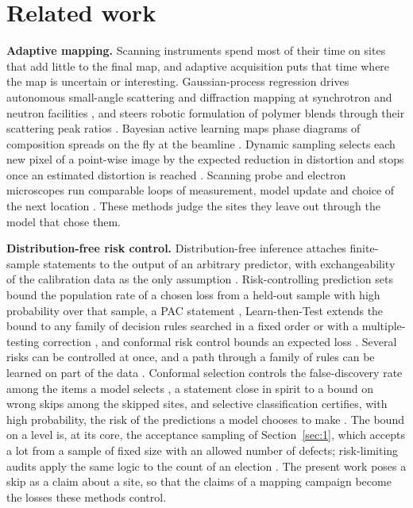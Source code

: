 \documentclass{iopjournal}
\begin{document}
\hypertarget{sec:2}{%
\section{Related work}\label{sec:2}}

\textbf{Adaptive mapping.} Scanning instruments spend most of their time on sites that add little to the final map, and adaptive acquisition puts that time where the map is uncertain or interesting. Gaussian-process regression drives autonomous small-angle scattering and diffraction mapping at synchrotron and neutron facilities \cite{Noack2019,Noack2020,Noack2021}, and steers robotic formulation of polymer blends through their scattering peak ratios \cite{Upreti2026}. Bayesian active learning maps phase diagrams of composition spreads on the fly at the beamline \cite{Kusne2020}. Dynamic sampling selects each new pixel of a point-wise image by the expected reduction in distortion and stops once an estimated distortion is reached \cite{Godaliyadda2018}. Scanning probe and electron microscopes run comparable loops of measurement, model update and choice of the next location \cite{Kalinin2021,Ziatdinov2022}. These methods judge the sites they leave out through the model that chose them.

\textbf{Distribution-free risk control.} Distribution-free inference attaches finite-sample statements to the output of an arbitrary predictor, with exchangeability of the calibration data as the only assumption \cite{Vovk2005,Angelopoulos2023}. Risk-controlling prediction sets bound the population rate of a chosen loss from a held-out sample with high probability over that sample, a PAC statement \cite{Bates2021,Park2020}, Learn-then-Test extends the bound to any family of decision rules searched in a fixed order or with a multiple-testing correction \cite{Angelopoulos2025}, and conformal risk control bounds an expected loss \cite{Angelopoulos2024}. Several risks can be controlled at once, and a path through a family of rules can be learned on part of the data \cite{LauferGoldshtein2023}. Conformal selection controls the false-discovery rate among the items a model selects \cite{Jin2023}, a statement close in spirit to a bound on wrong skips among the skipped sites, and selective classification certifies, with high probability, the risk of the predictions a model chooses to make \cite{Geifman2017}. The bound on a level is, at its core, the acceptance sampling of Section~\ref{sec:1}, which accepts a lot from a sample of fixed size with an allowed number of defects; risk-limiting audits apply the same logic to the count of an election \cite{LindemanStark2012}. The present work poses a skip as a claim about a site, so that the claims of a mapping campaign become the losses these methods control.
\end{document}
